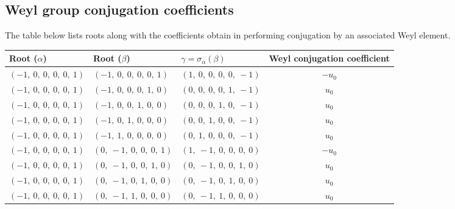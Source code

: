\documentclass[11pt]{article}
\newcommand{\noi}{\noindent}
\theoremstyle{definition}
\begin{document}
\subsection{Weyl group conjugation coefficients}

\noi The table below lists roots along with the coefficients obtain in performing conjugation by an associated Weyl element.

\bigskip

\noi \noindent \begin{longtable}{|l|l|l|c|}
    \hline
    \textbf{Root ($\alpha$)} & \textbf{Root ($\beta$)} & \textbf{$\gamma = \sigma_{\alpha}(\beta)$} & \textbf{Weyl conjugation coefficient} \\
    \hline
    \endhead
    $\left( -1, \  0, \  0, \  0, \  0, \  1\right)$ & $\left( -1, \  0, \  0, \  0, \  0, \  1\right)$ & $\left( 1, \  0, \  0, \  0, \  0, \  -1\right)$ & $- u_{0}$ \\
    \hline
    $\left( -1, \  0, \  0, \  0, \  0, \  1\right)$ & $\left( -1, \  0, \  0, \  0, \  1, \  0\right)$ & $\left( 0, \  0, \  0, \  0, \  1, \  -1\right)$ & $u_{0}$ \\
    \hline
    $\left( -1, \  0, \  0, \  0, \  0, \  1\right)$ & $\left( -1, \  0, \  0, \  1, \  0, \  0\right)$ & $\left( 0, \  0, \  0, \  1, \  0, \  -1\right)$ & $u_{0}$ \\
    \hline
    $\left( -1, \  0, \  0, \  0, \  0, \  1\right)$ & $\left( -1, \  0, \  1, \  0, \  0, \  0\right)$ & $\left( 0, \  0, \  1, \  0, \  0, \  -1\right)$ & $u_{0}$ \\
    \hline
    $\left( -1, \  0, \  0, \  0, \  0, \  1\right)$ & $\left( -1, \  1, \  0, \  0, \  0, \  0\right)$ & $\left( 0, \  1, \  0, \  0, \  0, \  -1\right)$ & $u_{0}$ \\
    \hline
    $\left( -1, \  0, \  0, \  0, \  0, \  1\right)$ & $\left( 0, \  -1, \  0, \  0, \  0, \  1\right)$ & $\left( 1, \  -1, \  0, \  0, \  0, \  0\right)$ & $- u_{0}$ \\
    \hline
    $\left( -1, \  0, \  0, \  0, \  0, \  1\right)$ & $\left( 0, \  -1, \  0, \  0, \  1, \  0\right)$ & $\left( 0, \  -1, \  0, \  0, \  1, \  0\right)$ & $u_{0}$ \\
    \hline
    $\left( -1, \  0, \  0, \  0, \  0, \  1\right)$ & $\left( 0, \  -1, \  0, \  1, \  0, \  0\right)$ & $\left( 0, \  -1, \  0, \  1, \  0, \  0\right)$ & $u_{0}$ \\
    \hline
    $\left( -1, \  0, \  0, \  0, \  0, \  1\right)$ & $\left( 0, \  -1, \  1, \  0, \  0, \  0\right)$ & $\left( 0, \  -1, \  1, \  0, \  0, \  0\right)$ & $u_{0}$ \\

\end{longtable}
\end{document}
